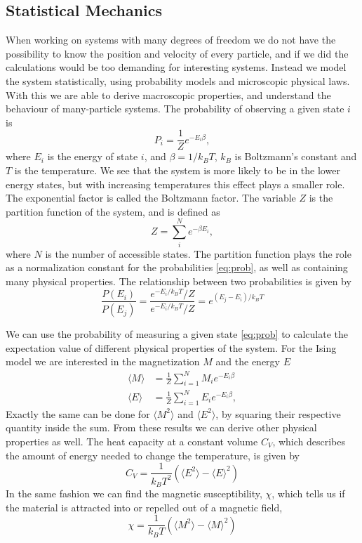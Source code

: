 \documentclass[%
 reprint,
nofootinbib,
aps,
]{revtex4-1}
\begin{document}
\subsection{Statistical Mechanics}
When working on systems with many degrees of freedom we do not have the possibility to know the position and velocity of every particle, and if we did the calculations would be too demanding for interesting systems. Instead we model the system statistically, using probability models and microscopic physical laws. With this we are able to derive macroscopic properties, and understand the behaviour of many-particle systems.
The probability of observing a given state $i$ is
\begin{equation}
    P_i = \frac{1}{Z}e^{-E_i\beta}, \label{eq:prob}
\end{equation}
where $E_i$ is the energy of state $i$, and $\beta = 1/k_BT$, $k_B$ is Boltzmann's constant and $T$ is the temperature. We see that the system is more likely to be in the lower energy states, but with increasing temperatures this effect plays a smaller role. The exponential factor is called the Boltzmann factor. The variable $Z$ is the partition function of the system, and is defined as
\begin{equation}
    Z = \sum_{i}^{N}e^{-\beta E_i}, \label{eq:partifunc}
\end{equation}
where $N$ is the number of accessible states. The partition function plays the role as a normalization constant for the probabilities \eqref{eq:prob}, as well as containing many physical properties. The relationship between two probabilities is given by
\begin{equation}
  \frac{P(E_i)}{P(E_j)} = \frac{e^{-E_i/k_BT}/Z}{e^{-E_i/k_BT}/Z} = e^{(E_j-E_i)/k_BT} \label{eq:prob_rel}
\end{equation}

We can use the probability of measuring a given state \eqref{eq:prob} to calculate the expectation value of different physical properties of the system. For the Ising model we are interested in the magnetization $M$ and the energy $E$
\begin{align}
    \langle M \rangle &= \frac{1}{Z}\sum_{i=1}^{N}M_ie^{-E_i\beta} \label{eq:E}\\
    \langle E \rangle &= \frac{1}{Z}\sum_{i=1}^{N}E_ie^{-E_i\beta}, \label{eq:M}
\end{align}
Exactly the same can be done for $\langle M^2\rangle$ and $\langle E^2\rangle$, by squaring their respective quantity inside the sum.
From these results we can derive other physical properties as well. The heat capacity at a constant volume $C_V$, which describes the amount of energy needed to change the temperature, is given by
\begin{equation}
    C_V = \frac{1}{k_BT^2}\left( \langle E^2\rangle - \langle E \rangle^2\right) \label{eq:Cv}
\end{equation}
In the same fashion we can find the magnetic susceptibility, $\chi$, which tells us if the material is attracted into or repelled out of a magnetic field,
\begin{equation}
    \chi = \frac{1}{k_BT}\left( \langle M^2 \rangle - \langle M \rangle^2 \right) \label{eq:chi}
\end{equation}
\end{document}
